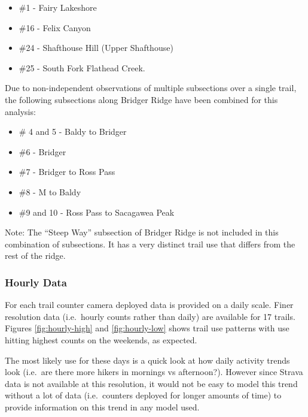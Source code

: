 \documentclass[
]{book}
\providecommand{\tightlist}{%
  \setlength{\itemsep}{0pt}\setlength{\parskip}{0pt}}
\begin{document}
\begin{itemize}
\tightlist
\item
  \#1 - Fairy Lakeshore
\item
  \#16 - Felix Canyon
\item
  \#24 - Shafthouse Hill (Upper Shafthouse)
\item
  \#25 - South Fork Flathead Creek.
\end{itemize}

Due to non-independent observations of multiple subsections over a
single trail, the following subsections along Bridger Ridge have been
combined for this analysis:

\begin{itemize}
\item
  \# 4 and 5 - Baldy to Bridger
\item
  \#6 - Bridger
\item
  \#7 - Bridger to Ross Pass
\item
  \#8 - M to Baldy
\item
  \#9 and 10 - Ross Pass to Sacagawea Peak
\end{itemize}

Note: The ``Steep Way'' subsection of Bridger Ridge is not included in
this combination of subsections. It has a very distinct trail use that
differs from the rest of the ridge.

\hypertarget{hourly-data}{%
\subsubsection{Hourly Data}\label{hourly-data}}

For each trail counter camera deployed data is provided on a daily
scale. Finer resolution data (i.e.~hourly counts rather than daily) are
available for 17 trails. Figures \ref{fig:hourly-high} and
\ref{fig:hourly-low} shows trail use patterns with use hitting highest
counts on the weekends, as expected.

The most likely use for these days is a quick look at how daily activity
trends look (i.e.~are there more hikers in mornings vs afternoon?).
However since Strava data is not available at this resolution, it would
not be easy to model this trend without a lot of data (i.e.~counters
deployed for longer amounts of time) to provide information on this
trend in any model used.
\end{document}
